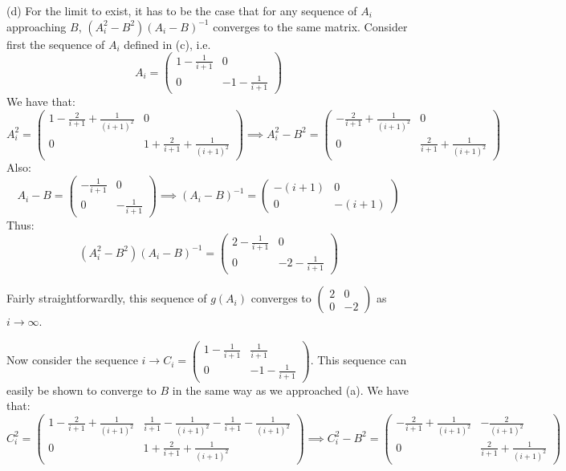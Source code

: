 \begin{solution}
    (d) For the limit to exist, it has to be the case that for any sequence of $A_i$ approaching $B$, $(A_i^2 - B^2)(A_i - B)^{-1}$ converges to the same matrix. Consider first the sequence of $A_i$ defined in (c), i.e. 
    $$A_i = \begin{pmatrix}
        1 - \frac{1}{i+1} & 0 \\ 0 & -1 - \frac{1}{i+1}
    \end{pmatrix}$$
    We have that:
    $$A_i^2 = \begin{pmatrix}
        1 - \frac{2}{i+1} + \frac{1}{(i+1)^2} & 0 \\ 0 & 1 + \frac{2}{i+1} + \frac{1}{(i+1)^2}
    \end{pmatrix} \implies A_i^2 - B^2 = \begin{pmatrix}
        -\frac{2}{i+1} + \frac{1}{(i+1)^2} & 0 \\ 0 & \frac{2}{i+1} + \frac{1}{(i+1)^2}
    \end{pmatrix}$$
    Also:
    $$A_i - B = \begin{pmatrix} 
        -\frac{1}{i+1} & 0 \\ 0 & -\frac{1}{i+1}
    \end{pmatrix} \implies (A_i - B)^{-1} = \begin{pmatrix}
        -(i+1) & 0 \\ 0 & -(i+1)
    \end{pmatrix}$$
    Thus:
    $$(A_i^2 - B^2)(A_i-B)^{-1} = \begin{pmatrix}
        2 - \frac{1}{i+1} & 0 \\ 0 & -2 - \frac{1}{i+1}
    \end{pmatrix}$$

    Fairly straightforwardly, this sequence of $g(A_i)$ converges to $\begin{pmatrix}
        2 & 0 \\ 0 & -2
    \end{pmatrix}$ as $i \rightarrow \infty$.
    
    Now consider the sequence $ i \rightarrow C_i = \begin{pmatrix}
        1 - \frac{1}{i+1} & \frac{1}{i+1} \\ 0 & -1 - \frac{1}{i+1}
    \end{pmatrix}$. This sequence can easily be shown to converge to $B$ in the same way as we approached (a). We have that:
    $$C_i^2 = \left(\begin{array}{ll}
        1 - \frac{2}{i+1} + \frac{1}{(i+1)^2} & \frac{1}{i+1} - \frac{1}{(i+1)^2} -\frac{1}{i+1} - \frac{1}{(i+1)^2} \\ 0 & 1 + \frac{2}{i+1} + \frac{1}{(i+1)^2}
    \end{array}\right) \implies C_i^2 - B^2 =  \begin{pmatrix}
        -\frac{2}{i+1} + \frac{1}{(i+1)^2} & -\frac{2}{(i+1)^2} \\
        0 & \frac{2}{i+1} + \frac{1}{(i+1)^2}
    \end{pmatrix}$$


\end{solution}
